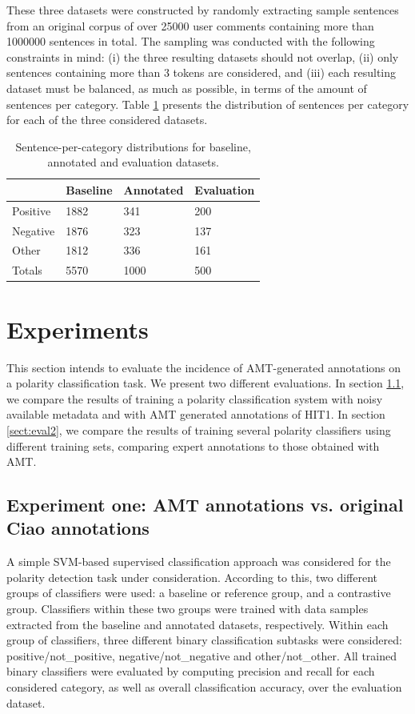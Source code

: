 \documentclass[11pt, a4paper,onecolumn]{article}
\begin{document}
These three datasets were constructed by randomly extracting sample sentences from an original corpus
of over 25000 user comments containing more than 1000000 sentences in total. The sampling was conducted 
with the following constraints in mind: (i) the three resulting datasets should not overlap, (ii) only sentences 
containing more than 3 tokens are considered, and (iii) each resulting dataset must be balanced, as much
as possible, in terms of the amount of sentences per category. Table \ref{tc_corpus} presents the
distribution of sentences per category for each of the three considered datasets.  

\begin{table}
\begin{center}
\begin{tabular}{|l|l|l|l|}
\hline
&Baseline &Annotated &Evaluation \\
\hline
Positive &1882 &341 &200 \\
\hline
Negative &1876 &323 &137 \\
\hline
Other &1812 &336 &161 \\
\hline
Totals &5570 &1000 &500 \\
\hline
\end{tabular}
\caption{Sentence-per-category distributions for baseline, annotated and evaluation datasets.}
\label{tc_corpus}
\end{center}
\end{table}

\section{Experiments}
\label{sect:classifier}


This section intends to evaluate the incidence of AMT-generated annotations on a polarity classification task. We present two different evaluations. In section \ref{sect:eval1}, we compare the results of training a polarity classification system with noisy available metadata and with AMT generated annotations of HIT1. In section \ref{sect:eval2}, we compare the results of training several polarity classifiers using different training sets, comparing expert annotations to those obtained with AMT.


\subsection{Experiment one: AMT annotations vs. original Ciao annotations}
\label{sect:eval1}
A simple SVM-based supervised classification approach was considered for the
polarity detection task under consideration. According to this, two different groups of classifiers were 
used: a baseline or reference group, and a contrastive group. Classifiers within these two groups were
trained with data samples extracted from the baseline and annotated datasets, respectively. Within each group 
of classifiers, three different binary classification subtasks were considered: positive/not\_positive, 
negative/not\_negative and other/not\_other. All trained binary classifiers were evaluated by computing 
precision and recall for each considered category, as well as overall classification accuracy, over the 
evaluation dataset.
\end{document}
